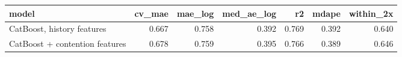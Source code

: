 \begin{tabular}{lrrrrrr}
\toprule
model & cv_mae & mae_log & med_ae_log & r2 & mdape & within_2x \\
\midrule
CatBoost, history features & 0.667 & 0.758 & 0.392 & 0.769 & 0.392 & 0.640 \\
CatBoost + contention features & 0.678 & 0.759 & 0.395 & 0.766 & 0.389 & 0.646 \\
\bottomrule
\end{tabular}

